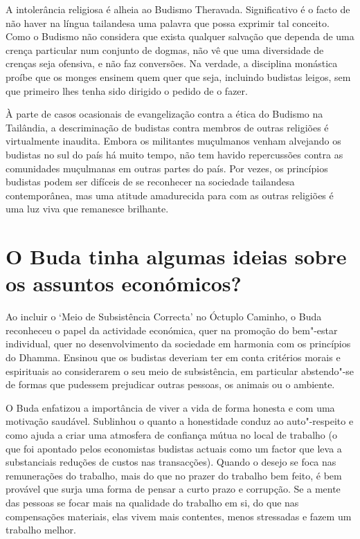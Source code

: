 A intolerância religiosa é alheia ao Budismo Theravada. Significativo é
o facto de não haver na língua tailandesa uma palavra que possa exprimir
tal conceito. Como o Budismo não considera que exista qualquer salvação
que dependa de uma crença particular num conjunto de dogmas, não vê que
uma diversidade de crenças seja ofensiva, e não faz conversões. Na
verdade, a disciplina monástica proíbe que os monges ensinem quem quer
que seja, incluindo budistas leigos, sem que primeiro lhes tenha sido
dirigido o pedido de o fazer.

À parte de casos ocasionais de evangelização contra a ética do Budismo
na Tailândia, a descriminação de budistas contra membros de outras
religiões é virtualmente inaudita. Embora os militantes muçulmanos
venham alvejando os budistas no sul do país há muito tempo, não tem
havido repercussões contra as comunidades muçulmanas em outras partes do
país. Por vezes, os princípios budistas podem ser difíceis de se
reconhecer na sociedade tailandesa contemporânea, mas uma atitude
amadurecida para com as outras religiões é uma luz viva que remanesce
brilhante.

\section{O Buda tinha algumas ideias sobre os assuntos económicos?}

Ao incluir o `Meio de Subsistência Correcta' no Óctuplo Caminho, o
Buda reconheceu o papel da actividade económica, quer na promoção do
bem"-estar individual, quer no desenvolvimento da sociedade em harmonia
com os princípios do Dhamma. Ensinou que os budistas deveriam ter em
conta critérios morais e espirituais ao considerarem o seu meio de
subsistência, em particular abstendo"-se de formas que pudessem
prejudicar outras pessoas, os animais ou o ambiente.

O Buda enfatizou a importância de viver a vida de forma honesta e com
uma motivação saudável. Sublinhou o quanto a honestidade conduz ao
auto"-respeito e como ajuda a criar uma atmosfera de confiança mútua no
local de trabalho (o que foi apontado pelos economistas budistas actuais
como um factor que leva a substanciais reduções de custos nas
transacções). Quando o desejo se foca nas remunerações do trabalho, mais
do que no prazer do trabalho bem feito, é bem provável que surja uma
forma de pensar a curto prazo e corrupção. Se a mente das pessoas se
focar mais na qualidade do trabalho em si, do que nas compensações
materiais, elas vivem mais contentes, menos stressadas e fazem um
trabalho melhor.

